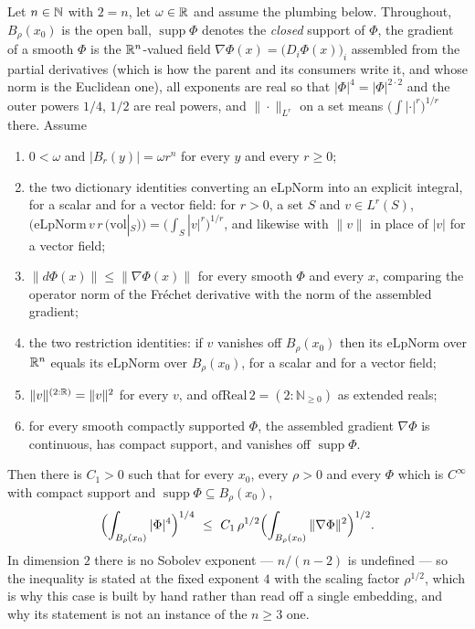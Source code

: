 \begin{helper}
Let $n\in\mathbb{N}$ with $2=n$, let $\omega\in\mathbb{R}$ and assume the plumbing below.
Throughout, $B_\rho(x_0)$ is the open ball, $\operatorname{supp}\Phi$ denotes
the \emph{closed} support of $\Phi$, the gradient of a smooth $\Phi$ is the
$\mathbb{R}^n$-valued field $\nabla\Phi(x)=\bigl(D_i\Phi(x)\bigr)_i$ assembled from the
partial derivatives (which is how the parent and its consumers write it, and
whose norm is the Euclidean one), all exponents are real so that
$|\Phi|^{4}=|\Phi|^{2\cdot2}$ and the outer powers $1/4$, $1/2$ are real
powers, and $\|\cdot\|_{L^r}$ on a set means
$\bigl(\int|\cdot|^{r}\bigr)^{1/r}$ there.  Assume
\begin{enumerate}
\item[(H1)] $0<\omega$ and $|B_r(y)|=\omega r^{n}$ for every $y$ and every
  $r\ge0$;
\item[(H2)] the two dictionary identities converting an $\mathrm{eLpNorm}$ into
  an explicit integral, for a scalar and for a vector field: for $r>0$, a set
  $S$ and $v\in L^r(S)$,
  $\bigl(\mathrm{eLpNorm}\,v\,r\,(\mathrm{vol}|_S)\bigr)
   =\bigl(\int_S|v|^{r}\bigr)^{1/r}$, and likewise with $\|v\|$ in place of
  $|v|$ for a vector field;
\item[(H3)] $\|d\Phi(x)\|\le\|\nabla\Phi(x)\|$ for every smooth $\Phi$ and
  every $x$, comparing the operator norm of the Fréchet derivative with the
  norm of the assembled gradient;
\item[(H4)] the two restriction identities: if $v$ vanishes off $B_\rho(x_0)$
  then its $\mathrm{eLpNorm}$ over $\mathbb{R}^n$ equals its $\mathrm{eLpNorm}$ over
  $B_\rho(x_0)$, for a scalar and for a vector field;
\item[(H5)] $\|v\|^{(2:\mathbb{R})}=\|v\|^{2}$ for every $v$, and
  $\mathrm{ofReal}\,2=(2:\mathbb{N}_{\ge0})$ as extended reals;
\item[(H6)] for every smooth compactly supported $\Phi$, the assembled gradient
  $\nabla\Phi$ is continuous, has compact support, and vanishes off
  $\operatorname{supp}\Phi$.
\end{enumerate}
Then there is $C_1>0$ such that for every $x_0$, every $\rho>0$ and every
$\Phi$ which is $C^\infty$ with compact support and
$\operatorname{supp}\Phi\subseteq B_\rho(x_0)$,
\[
\Bigl(\int_{B_\rho(x_0)}|\Phi|^{4}\Bigr)^{1/4}
\ \le\ C_1\,\rho^{1/2}
  \Bigl(\int_{B_\rho(x_0)}\|\nabla\Phi\|^{2}\Bigr)^{1/2}.
\]
In dimension $2$ there is no Sobolev exponent --- $n/(n-2)$ is undefined --- so
the inequality is stated at the fixed exponent $4$ with the scaling factor
$\rho^{1/2}$, which is why this case is built by hand rather than read off a
single embedding, and why its statement is not an instance of the $n\ge3$ one.
\end{helper}
